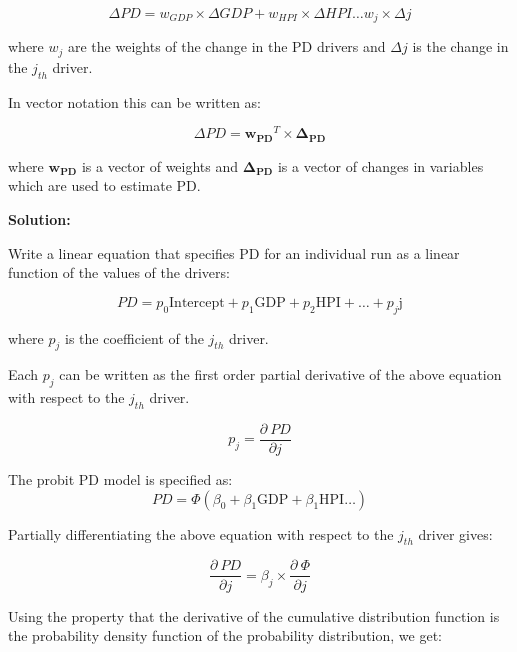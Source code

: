 \documentclass{article}
\numberwithin{equation}{section}
\begin{document}
\begin{equation} \Delta PD = w_{GDP} \times \Delta GDP + w_{HPI} \times \Delta HPI \hdots w_j \times \Delta j\end{equation}

where $w_{j}$ are the weights of the change in the PD drivers and $\Delta j$ is the change in the $j_{th}$ driver.

In vector notation this can be written as:

\begin{equation} \Delta PD = \mathbf{w_{PD}}^T \times \mathbf{\Delta_{PD}} \end{equation}

where $\mathbf{w_{PD}}$ is a vector of weights and $\mathbf{\Delta_{PD}}$ is a vector of changes in variables which are used to estimate PD.

\textbf{Solution:} 

 Write a linear equation that specifies PD for an individual run as a linear function of the values of the drivers:
 
\begin{equation} \label{lin_PD} PD = p_0 \text{Intercept} + p_1 \text{GDP} + p_2 \text{HPI} + \hdots + p_j \text{j} \end{equation}

where $p_j$ is the coefficient of the $j_{th}$ driver. 

Each $p_j$ can be written as the first order partial derivative of the above equation with respect to the $j_{th}$ driver.

\begin{equation} p_j = \frac{\partial \ PD}{\partial j} \end{equation}

 The probit PD model is specified as: 
\begin{equation} PD  = \Phi (\beta_0 + \beta_1 \text{GDP} + \beta_1 \text{HPI} \hdots ) \end{equation}

Partially differentiating the above equation with respect to the $j_{th}$ driver gives:

\begin{equation} \label{PD_der}\frac{\partial \ PD}{\partial j} = \beta_j \times \frac{\partial \ \Phi}{\partial j} \end{equation}

Using the property that the derivative of the cumulative distribution function is the probability density function of the probability distribution, we get:
\end{document}

